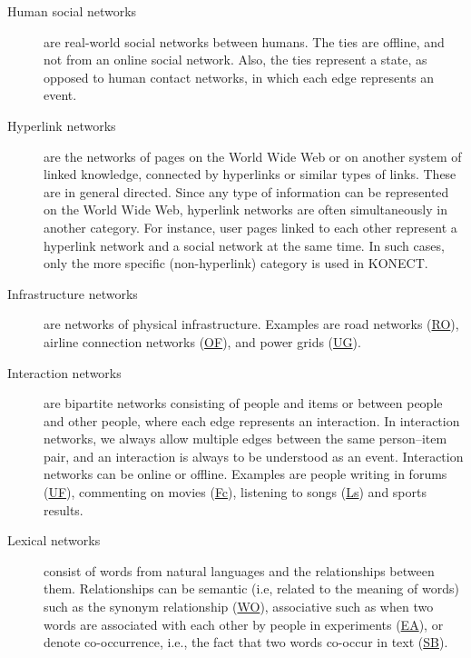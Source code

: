 \documentclass{article}
\begin{document}
\begin{description}
\item[Human social networks] are real-world social networks between
  humans.   The ties are offline,
  and not from an online social network.  Also, the ties represent a
  state, as opposed to human contact networks, in which each edge
  represents an event.

\item[Hyperlink networks] are the
  networks  of pages on the World Wide Web
  or on another system of linked knowledge,
  connected by hyperlinks or similar types of links.  These are in general directed.  Since any
  type of information can be represented on the World Wide Web,
  hyperlink networks are often simultaneously in another category.  For
  instance, user pages linked to each other represent a hyperlink
  network and a social network at the same time.  In such cases, only
  the more specific (non-hyperlink) category is used in KONECT.

\item[Infrastructure networks] are networks of physical infrastructure.  
  Examples are road networks
  (\href{http://konect.cc/networks/roadNet-CA/}{\textsf{RO}}), airline
  connection networks
  (\href{http://konect.cc/networks/opsahl-openflights/}{\textsf{OF}}), 
  and power grids
  (\href{http://konect.cc/networks/opsahl-powergrid/}{\textsf{UG}}).  
  
\item[Interaction networks] are bipartite networks consisting of people
  and items or between people and other people, where each edge represents an interaction. 
  In interaction networks, we always allow multiple edges between the
  same person--item pair, and an interaction is always to be understood as an event. 
  Interaction networks can be online or offline.
  Examples are
  people writing in forums
  (\href{http://konect.cc/networks/opsahl-ucforum/}{\textsf{UF}}),
  commenting on movies
  (\href{http://konect.cc/networks/filmtipset_comment/}{\textsf{Fc}}),
  listening to songs
  (\href{http://konect.cc/networks/lastfm_song/}{\textsf{Ls}})
  and sports results. 

\item[Lexical networks] consist of words from natural 
   languages and the relationships between
  them.  Relationships can be semantic (i.e, related to the meaning of
  words) such as the synonym relationship
  (\href{http://konect.cc/networks/wordnet-words/}{\textsf{WO}}),
  associative such as when two words are associated with each other by
  people in experiments
  (\href{http://konect.cc/networks/eat/}{\textsf{EA}}), or denote
  co-occurrence, i.e., the fact that two words co-occur in text
  (\href{http://konect.cc/networks/lasagne-spanishbook/}{\textsf{SB}}).


\end{description}
\end{document}
